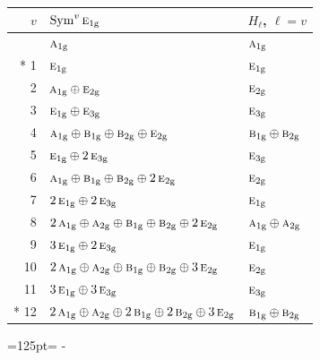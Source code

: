 \documentclass[10pt,a4paper]{article}
\newcommand{\needspace}[1]{\par\penalty-100\begingroup\dimen0=#1\relax\dimen2=\pagegoal
  \advance\dimen2-\pagetotal\ifdim\dimen0>\dimen2\relax\ifdim\dimen2>0pt\vfil\break\fi\fi
  \endgroup}
\numberwithin{equation}{section}
\newcommand{\irr}[1]{\text{\normalfont\scshape #1}}
\newcommand{\ptag}[1]{\mathrm{#1}}
\begin{document}
{\small\begin{longtable}{@{}rll@{}}\toprule
$v$ & $\operatorname{Sym}^{v}\irr{e}_{1\ptag{g}}$ & $H_\ell$, $\ell = v$\\\midrule\endhead
\bottomrule\endfoot\endlastfoot
0 & $\irr{a}_{1\ptag{g}}$ & $\irr{a}_{1\ptag{g}}$\\*
1 & $\irr{e}_{1\ptag{g}}$ & $\irr{e}_{1\ptag{g}}$\\
2 & $\irr{a}_{1\ptag{g}} \oplus \irr{e}_{2\ptag{g}}$ & $\irr{e}_{2\ptag{g}}$\\
3 & $\irr{e}_{1\ptag{g}} \oplus \irr{e}_{3\ptag{g}}$ & $\irr{e}_{3\ptag{g}}$\\
4 & $\irr{a}_{1\ptag{g}} \oplus \irr{b}_{1\ptag{g}} \oplus \irr{b}_{2\ptag{g}} \oplus \irr{e}_{2\ptag{g}}$ & $\irr{b}_{1\ptag{g}} \oplus \irr{b}_{2\ptag{g}}$\\
5 & $\irr{e}_{1\ptag{g}} \oplus 2\,\irr{e}_{3\ptag{g}}$ & $\irr{e}_{3\ptag{g}}$\\
6 & $\irr{a}_{1\ptag{g}} \oplus \irr{b}_{1\ptag{g}} \oplus \irr{b}_{2\ptag{g}} \oplus 2\,\irr{e}_{2\ptag{g}}$ & $\irr{e}_{2\ptag{g}}$\\
7 & $2\,\irr{e}_{1\ptag{g}} \oplus 2\,\irr{e}_{3\ptag{g}}$ & $\irr{e}_{1\ptag{g}}$\\
8 & $2\,\irr{a}_{1\ptag{g}} \oplus \irr{a}_{2\ptag{g}} \oplus \irr{b}_{1\ptag{g}} \oplus \irr{b}_{2\ptag{g}} \oplus 2\,\irr{e}_{2\ptag{g}}$ & $\irr{a}_{1\ptag{g}} \oplus \irr{a}_{2\ptag{g}}$\\
9 & $3\,\irr{e}_{1\ptag{g}} \oplus 2\,\irr{e}_{3\ptag{g}}$ & $\irr{e}_{1\ptag{g}}$\\
10 & $2\,\irr{a}_{1\ptag{g}} \oplus \irr{a}_{2\ptag{g}} \oplus \irr{b}_{1\ptag{g}} \oplus \irr{b}_{2\ptag{g}} \oplus 3\,\irr{e}_{2\ptag{g}}$ & $\irr{e}_{2\ptag{g}}$\\
11 & $3\,\irr{e}_{1\ptag{g}} \oplus 3\,\irr{e}_{3\ptag{g}}$ & $\irr{e}_{3\ptag{g}}$\\*
12 & $2\,\irr{a}_{1\ptag{g}} \oplus \irr{a}_{2\ptag{g}} \oplus 2\,\irr{b}_{1\ptag{g}} \oplus 2\,\irr{b}_{2\ptag{g}} \oplus 3\,\irr{e}_{2\ptag{g}}$ & $\irr{b}_{1\ptag{g}} \oplus \irr{b}_{2\ptag{g}}$\\
\bottomrule\end{longtable}}
\needspace{125pt}
\end{document}
